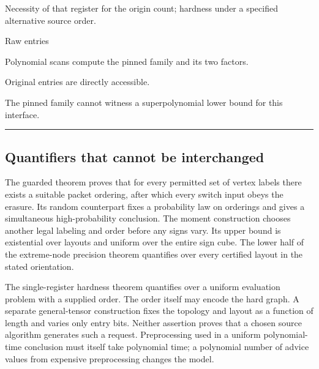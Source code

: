 \documentclass[11pt,a4paper]{article}
\newlength{\OfflineResearchTableWidth}
\newcommand{\OfflineResearchHeaderRule}{\noindent\rule{\linewidth}{0.45pt}\par}
\newcommand{\OfflineResearchRow}{\par}
\newenvironment{OfflineResearchTable}{%
  \par\medskip\begingroup\small\setlength{\parindent}{0pt}%
  \setlength{\parskip}{3pt plus 1pt minus .5pt}%
  \setlength{\OfflineResearchTableWidth}{\linewidth}%
}{%
  \par\endgroup\medskip%
}
\begin{document}
\begin{OfflineResearchTable}
\begin{minipage}[t]{0.23625\OfflineResearchTableWidth}
\end{minipage}\hfill%
\begin{minipage}[t]{0.30240\OfflineResearchTableWidth}\raggedright
Necessity of that
register for the origin count; hardness under a specified alternative
source order.
\end{minipage}%
\OfflineResearchRow
\noindent%
\begin{minipage}[t]{0.17955\OfflineResearchTableWidth}\raggedright
Raw entries
\end{minipage}\hfill%
\begin{minipage}[t]{0.22680\OfflineResearchTableWidth}\raggedright
Polynomial scans compute the pinned family and its two
factors.
\end{minipage}\hfill%
\begin{minipage}[t]{0.23625\OfflineResearchTableWidth}\raggedright
Original entries are directly accessible.
\end{minipage}\hfill%
\begin{minipage}[t]{0.30240\OfflineResearchTableWidth}\raggedright
The pinned family
cannot witness a superpolynomial lower bound for this interface.
\end{minipage}%
\OfflineResearchRow
\OfflineResearchHeaderRule
\end{OfflineResearchTable}

\subsection{Quantifiers that cannot be
interchanged}\label{v9-quantifiers-that-cannot-be-interchanged}

The guarded theorem proves that for every permitted set of vertex labels
there exists a suitable packet ordering, after which every switch input
obeys the erasure. Its random counterpart fixes a probability law on
orderings and gives a simultaneous high-probability conclusion. The
moment construction chooses another legal labeling and order before any
signs vary. Its upper bound is existential over layouts and uniform over
the entire sign cube. The lower half of the extreme-node precision
theorem quantifies over every certified layout in the stated
orientation.

The single-register hardness theorem quantifies over a uniform
evaluation problem with a supplied order. The order itself may encode
the hard graph. A separate general-tensor construction fixes the
topology and layout as a function of length and varies only entry bits.
Neither assertion proves that a chosen source algorithm generates such a
request. Preprocessing used in a uniform polynomial-time conclusion must
itself take polynomial time; a polynomial number of advice values from
expensive preprocessing changes the model.
\end{document}
